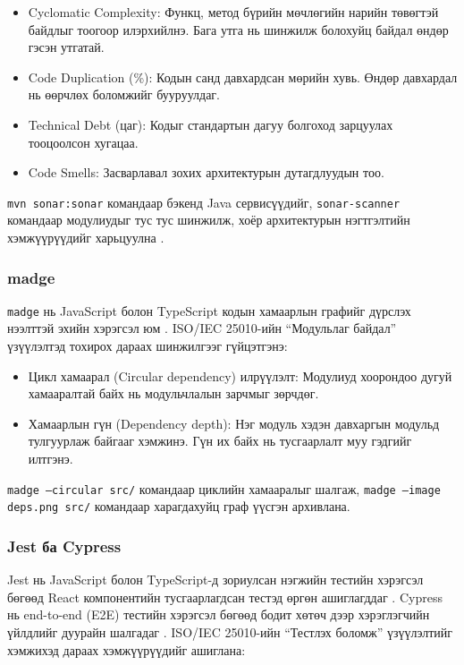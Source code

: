 \begin{itemize}
  \item Cyclomatic Complexity: Функц, метод бүрийн мөчлөгийн нарийн төвөгтэй байдлыг тоогоор илэрхийлнэ.
	Бага утга нь шинжилж болохуйц байдал өндөр гэсэн утгатай.
  \item Code Duplication (\%): Кодын санд давхардсан мөрийн хувь. Өндөр давхардал нь өөрчлөх боломжийг бууруулдаг.
  \item Technical Debt (цаг): Кодыг стандартын дагуу болгоход зарцуулах тооцоолсон хугацаа.
  \item Code Smells: Засварлавал зохих архитектурын дутагдлуудын тоо.
\end{itemize}

\texttt{mvn sonar:sonar} командаар бэкенд Java сервисүүдийг, \texttt{sonar-scanner} командаар модулиудыг тус тус шинжилж, хоёр архитектурын нэгтгэлтийн хэмжүүрүүдийг харьцуулна \cite{stefanovska2022}.

\subsubsection{madge}

\hspace*{0.6cm}\texttt{madge} нь JavaScript болон TypeScript кодын хамаарлын графийг дүрслэх нээлттэй эхийн хэрэгсэл юм \cite{madge_docs}. ISO/IEC 25010-ийн ``Модульлаг байдал'' үзүүлэлтэд тохирох дараах шинжилгээг гүйцэтгэнэ:

\begin{itemize}
  \item Цикл хамаарал (Circular dependency) илрүүлэлт: Модулиуд хоорондоо дугуй хамааралтай байх нь модульчлалын зарчмыг зөрчдөг.
  \item Хамаарлын гүн (Dependency depth): Нэг модуль хэдэн давхаргын модульд тулгуурлаж байгааг хэмжинэ. Гүн их байх нь тусгаарлалт муу гэдгийг илтгэнэ.
\end{itemize}

\texttt{madge --circular src/} командаар циклийн хамааралыг шалгаж, \texttt{madge --image deps.png src/} командаар харагдахуйц граф үүсгэн архивлана.

\subsubsection{Jest ба Cypress}

\hspace*{0.6cm}Jest нь JavaScript болон TypeScript-д зориулсан нэгжийн тестийн хэрэгсэл бөгөөд React компонентийн тусгаарлагдсан тестэд өргөн ашиглагддаг \cite{jest_docs}. Cypress нь end-to-end (E2E) тестийн хэрэгсэл бөгөөд бодит хөтөч дээр хэрэглэгчийн үйлдлийг дуурайн шалгадаг \cite{cypress_docs}. ISO/IEC 25010-ийн ``Тестлэх боломж'' үзүүлэлтийг хэмжихэд дараах хэмжүүрүүдийг ашиглана:

